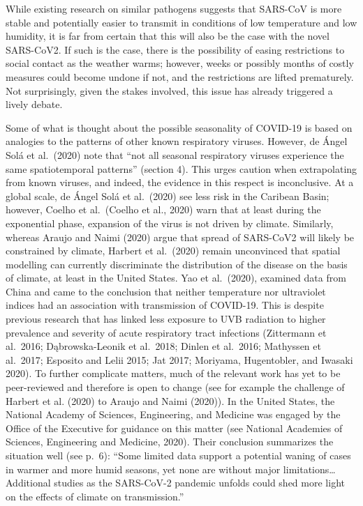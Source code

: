 \documentclass[]{elsarticle} %
\begin{document}
While existing research on similar pathogens suggests that SARS-CoV is
more stable and potentially easier to transmit in conditions of low
temperature and low humidity, it is far from certain that this will also
be the case with the novel SARS-CoV2. If such is the case, there is the
possibility of easing restrictions to social contact as the weather
warms; however, weeks or possibly months of costly measures could become
undone if not, and the restrictions are lifted prematurely. Not
surprisingly, given the stakes involved, this issue has already
triggered a lively debate.

Some of what is thought about the possible seasonality of COVID-19 is
based on analogies to the patterns of other known respiratory viruses.
However, de Ángel Solá et al.~(2020) note that ``not all seasonal
respiratory viruses experience the same spatiotemporal patterns''
(section 4). This urges caution when extrapolating from known viruses,
and indeed, the evidence in this respect is inconclusive. At a global
scale, de Ángel Solá et al.~(2020) see less risk in the Caribean Basin;
however, Coelho et al.~(Coelho et al., 2020) warn that at least during
the exponential phase, expansion of the virus is not driven by climate.
Similarly, whereas Araujo and Naimi (2020) argue that spread of
SARS-CoV2 will likely be constrained by climate, Harbert et al.~(2020)
remain unconvinced that spatial modelling can currently discriminate the
distribution of the disease on the basis of climate, at least in the
United States. Yao et al.~(2020), examined data from China and came to
the conclusion that neither temperature nor ultraviolet indices had an
association with transmission of COVID-19. This is despite previous
research that has linked less exposure to UVB radiation to higher
prevalence and severity of acute respiratory tract infections
(Zittermann et al.~2016; Dąbrowska-Leonik et al.~2018; Dinlen et
al.~2016; Mathyssen et al.~2017; Esposito and Lelii 2015; Jat 2017;
Moriyama, Hugentobler, and Iwasaki 2020). To further complicate matters,
much of the relevant work has yet to be peer-reviewed and therefore is
open to change (see for example the challenge of Harbert et al. (2020)
to Araujo and Naimi (2020)). In the United States, the National Academy
of Sciences, Engineering, and Medicine was engaged by the Office of the
Executive for guidance on this matter (see National Academies of
Sciences, Engineering and Medicine, 2020). Their conclusion summarizes
the situation well (see p.~6): ``Some limited data support a potential
waning of cases in warmer and more humid seasons, yet none are without
major limitations\ldots Additional studies as the SARS-CoV-2 pandemic
unfolds could shed more light on the effects of climate on
transmission.''
\end{document}

